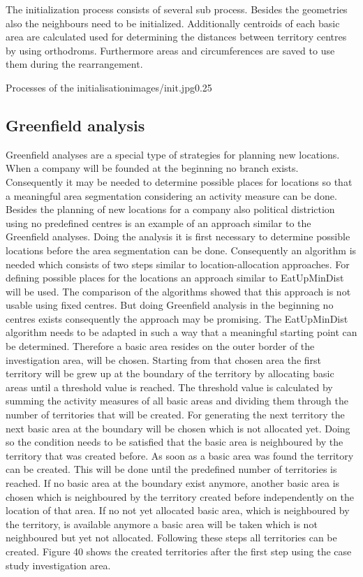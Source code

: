 The initialization process consists of several sub process. Besides the geometries also the neighbours need to be initialized. Additionally centroids of each basic area are calculated used for determining the distances between territory centres by using orthodroms. Furthermore areas and circumferences are saved to use them during the rearrangement.

\begin{figurevarSize}{Processes of the initialisation}{images/init.jpg}{0.25}\end{figurevarSize}

\subsection{Greenfield  analysis}

Greenfield analyses are a special type of strategies for planning new locations. When a company will be founded at the beginning no branch exists. Consequently it may be needed to determine possible places for locations so that a meaningful area segmentation considering an activity measure can be done. Besides the planning of new locations for a company also political distriction using no predefined centres is an example of an approach similar to the Greenfield analyses. Doing the analysis it is first necessary to determine possible locations before the area segmentation can be done. Consequently an algorithm is needed which consists of two steps similar to location-allocation approaches. For defining possible places for the locations an approach similar to EatUpMinDist will be used. The comparison of the algorithms showed that this approach is not usable using fixed centres. But doing Greenfield analysis in the beginning no centres exists consequently the approach may be promising. The EatUpMinDist algorithm needs to be adapted in such a way that a meaningful starting point can be determined. Therefore a basic area resides on the outer border of the investigation area, will be chosen. Starting from that chosen area the first territory will be grew up at the boundary of the territory by allocating basic areas until a threshold value is reached. The threshold value is calculated by summing the activity measures of all basic areas and dividing them through the number of territories that will be created. For generating the next territory the next basic area at the boundary will be chosen which is not allocated yet. Doing so the condition needs to be satisfied that the basic area is neighboured by the territory that was created before. As soon as a basic area was found the territory can be created. This will be done until the predefined number of territories is reached. If no basic area at the boundary exist anymore, another basic area is chosen which is neighboured by the territory created before independently on the location of that area. If no not yet allocated basic area, which is neighboured by the territory, is available anymore a basic area will be taken which is not neighboured but yet not allocated. Following these steps all territories can be created. Figure 40 shows the created territories after the first step using the case study investigation area.

